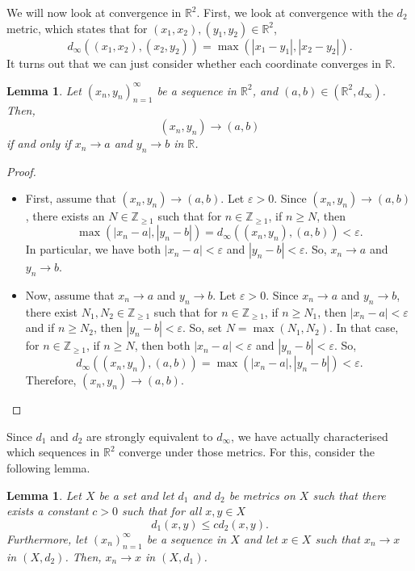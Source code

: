 \documentclass[a4paper, openany]{memoir}
\theoremstyle{definition}
\theoremstyle{plain}
\newtheorem{lemma}[definition]{Lemma}
\begin{document}
We will now look at convergence in $\mathbb{R}^2$. First, we look at convergence with the $d_2$ metric, which states that for $(x_1, x_2), (y_1, y_2) \in \mathbb{R}^2$,
\[d_\infty((x_1, x_2), (x_2, y_2)) = \max(|x_1 - y_1|, |x_2 - y_2|).\]
It turns out that we can just consider whether each coordinate converges in $\mathbb{R}$.
\begin{lemma}
Let $(x_n, y_n)_{n=1}^{\infty}$ be a sequence in $\mathbb{R}^2$, and $(a, b) \in (\mathbb{R}^2, d_\infty)$. Then,
\[(x_n, y_n) \to (a, b)\]
if and only if $x_n \to a$ and $y_n \to b$ in $\mathbb{R}$.
\end{lemma}
\begin{proof}
\hspace*{0pt}
\begin{itemize}
    \item First, assume that $(x_n, y_n) \to (a, b)$. Let $\varepsilon > 0$. Since $(x_n, y_n) \to (a, b)$, there exists an $N \in \mathbb{Z}_{\geqslant 1}$ such that for $n \in \mathbb{Z}_{\geqslant 1}$, if $n \geqslant N$, then 
    \[\max(|x_n - a|, |y_n - b|) = d_{\infty}((x_n, y_n), (a, b)) < \varepsilon.\]
    In particular, we have both $|x_n - a| < \varepsilon$ and $|y_n - b| < \varepsilon$. So, $x_n \to a$ and $y_n \to b$.
    
    \item Now, assume that $x_n \to a$ and $y_n \to b$. Let $\varepsilon > 0$. Since $x_n \to a$ and $y_n \to b$, there exist $N_1, N_2 \in \mathbb{Z}_{\geqslant 1}$ such that for $n \in \mathbb{Z}_{\geqslant 1}$, if $n \geqslant N_1$, then $|x_n - a| < \varepsilon$ and if $n \geqslant N_2$, then $|y_n - b| < \varepsilon$. So, set $N = \max(N_1, N_2)$. In that case, for $n \in \mathbb{Z}_{\geqslant 1}$, if $n \geqslant N$, then both $|x_n - a| < \varepsilon$ and $|y_n - b| < \varepsilon$. So,
    \[d_{\infty}((x_n, y_n), (a, b)) = \max(|x_n - a|, |y_n - b|) < \varepsilon.\]
    Therefore, $(x_n, y_n) \to (a, b)$.
\end{itemize}
\end{proof}
Since $d_1$ and $d_2$ are strongly equivalent to $d_\infty$, we have actually characterised which sequences in $\mathbb{R}^2$ converge under those metrics. For this, consider the following lemma.
\begin{lemma}
Let $X$ be a set and let $d_1$ and $d_2$ be metrics on $X$ such that there exists a constant $c > 0$ such that for all $x, y \in X$
\[d_1(x, y) \leqslant cd_2(x, y).\]
Furthermore, let $(x_n)_{n=1}^{\infty}$ be a sequence in $X$ and let $x \in X$ such that $x_n \to x$ in $(X, d_2)$. Then, $x_n \to x$ in $(X, d_1)$.
\end{lemma}
\end{document}
